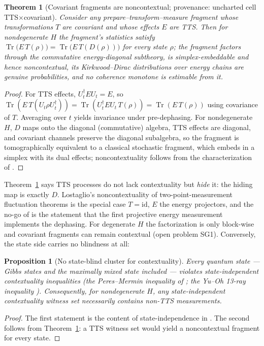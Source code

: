 \documentclass[11pt,a4paper]{article}
\newtheorem{theorem}{Theorem}
\newtheorem{proposition}{Proposition}
\theoremstyle{definition}
\newcommand{\tr}{\operatorname{Tr}}
\begin{document}
\begin{theorem}[Covariant fragments are noncontextual; provenance: uncharted
cell TTS$\times$covariant]\label{thm:n1}
Consider any prepare--transform--measure fragment whose transformations $T$
are covariant and whose effects $E$ are TTS. Then for nondegenerate $H$ the
fragment's statistics satisfy
$\tr\!\big(E\,T(\rho)\big)=\tr\!\big(E\,T(D(\rho))\big)$ for every state
$\rho$; the fragment factors through the commutative energy-diagonal
subtheory, is simplex-embeddable and hence noncontextual, its Kirkwood--Dirac
distributions over energy chains are genuine probabilities, and no coherence
monotone is estimable from it.
\end{theorem}
\begin{proof}
For TTS effects, $U_t^\dagger E U_t=E$, so
$\tr(E\,T(U_t\rho U_t^\dagger))=\tr(U_t^\dagger E U_t\,T(\rho))=\tr(E\,T(\rho))$
using covariance of $T$. Averaging over $t$ yields invariance under
pre-dephasing. For nondegenerate $H$, $D$ maps onto the diagonal (commutative)
algebra, TTS effects are diagonal, and covariant channels preserve the
diagonal subalgebra, so the fragment is tomographically equivalent to a
classical stochastic fragment, which embeds in a simplex with its dual
effects; noncontextuality follows from the characterization of
\cite{schmid2021}.
\end{proof}

Theorem~\ref{thm:n1} says TTS processes do not lack contextuality but
\emph{hide} it: the hiding map is exactly $D$. Lostaglio's noncontextuality of
two-point-measurement fluctuation theorems \cite{lostaglio2018} is the special
case $T=\mathrm{id}$, $E$ the energy projectors, and the no-go of
\cite{perarnau2017} is the statement that the first projective energy
measurement implements the dephasing. For degenerate $H$ the factorization is
only block-wise and covariant fragments can remain contextual (open problem
SG1). Conversely, the state side carries no blindness at all:

\begin{proposition}[No state-blind cluster for contextuality]\label{prop:n2}
Every quantum state --- Gibbs states and the maximally mixed state included ---
violates state-independent contextuality inequalities (the Peres--Mermin
inequality of \cite{cabello2008}; the Yu--Oh 13-ray inequality
\cite{yuoh2012}). Consequently, for nondegenerate $H$, any state-independent
contextuality witness set necessarily contains non-TTS measurements.
\end{proposition}
\begin{proof}
The first statement is the content of state-independence in
\cite{cabello2008,yuoh2012}. The second follows from Theorem~\ref{thm:n1}:
a TTS witness set would yield a noncontextual fragment for every state.
\end{proof}
\end{document}
